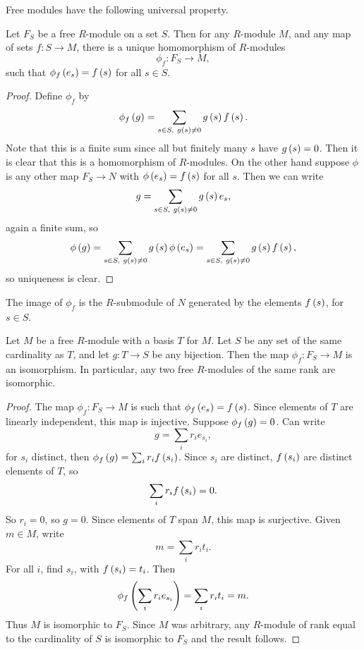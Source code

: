 \pagebreak

Free modules have the following universal property.

\begin{proposition}
Let $ F_S $ be a free $ R $-module on a set $ S $. Then for any $ R $-module $ M $, and any map of sets $ f : S \to M $, there is a unique homomorphism of $ R $-modules
$$ \phi_f : F_S \to M, $$
such that $ \phi_f\left( e_s \right) = f\left( s \right) $ for all $ s \in S $.
\end{proposition}

\begin{proof}
Define $ \phi_f $ by
$$ \phi_f\left( g \right) = \sum_{s \in S, \ g\left( s \right) \ne 0} g\left( s \right)f\left( s \right). $$
Note that this is a finite sum since all but finitely many $ s $ have $ g\left( s \right) = 0 $. Then it is clear that this is a homomorphism of $ R $-modules. On the other hand suppose $ \phi $ is any other map $ F_S \to N $ with $ \phi\left( e_s \right) = f\left( s \right) $ for all $ s $. Then we can write
$$ g = \sum_{s \in S, \ g\rb{s} \ne 0} g\rb{s}e_s, $$
again a finite sum, so
$$ \phi\left( g \right) = \sum_{s \in S, \ g\left( s \right) \ne 0} g\left( s \right)\phi\left( e_s \right) = \sum_{s \in S, \ g\left( s \right) \ne 0} g\left( s \right)f\left( s \right), $$
so uniqueness is clear.
\end{proof}

The image of $ \phi_f $ is the $ R $-submodule of $ N $ generated by the elements $ f\left( s \right) $, for $ s \in S $.

\begin{corollary}
Let $ M $ be a free $ R $-module with a basis $ T $ for $ M $. Let $ S $ be any set of the same cardinality as $ T $, and let $ g : T \to S $ be any bijection. Then the map $ \phi_f : F_S \to M $ is an isomorphism. In particular, any two free $ R $-modules of the same rank are isomorphic.
\end{corollary}

\begin{proof}
The map $ \phi_f : F_S \to M $ is such that $ \phi_f\left( e_s \right) = f\left( s \right) $. Since elements of $ T $ are linearly independent, this map is injective. Suppose $ \phi_f\left( g \right) = 0 $. Can write
$$ g = \sum_i r_ie_{s_i}, $$
for $ s_i $ distinct, then $ \phi_f\left( g \right) = \sum_i r_if\left( s_i \right) $. Since $ s_i $ are distinct, $ f\left( s_i \right) $ are distinct elements of $ T $, so
$$ \sum_i r_if\left( s_i \right) = 0. $$
So $ r_i = 0 $, so $ g = 0 $. Since elements of $ T $ span $ M $, this map is surjective. Given $ m \in M $, write
$$ m = \sum_i r_it_i. $$
For all $ i $, find $ s_i $, with $ f\left( s_i \right) = t_i $. Then
$$ \phi_f\left( \sum_i r_ie_{s_i} \right) = \sum_i r_it_i = m. $$
Thus $ M $ is isomorphic to $ F_S $. Since $ M $ was arbitrary, any $ R $-module of rank equal to the cardinality of $ S $ is isomorphic to $ F_S $ and the result follows.
\end{proof}

